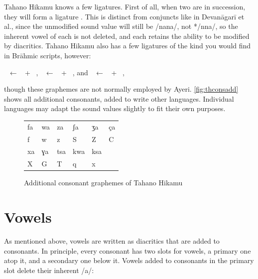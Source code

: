 Tahano Hikamu knows a few ligatures. First of all, when two   
are in succession, they will form a ligature  . This is 
distinct from conjuncts like in Devanāgarī et al., since the unmodified sound 
value will still be /nana/, not */nna/, so the inherent vowel of each  
 is not deleted, and each   retains the ability to be 
modified by diacritics. Tahano Hikamu also has a few ligatures of the kind you 
would find in Brāhmic scripts, however:

\pex
	\a {}~ ← ~ + ~, 
	\a {}~ ← ~ + ~, and 
	\a {}~ ← ~ + ~,
\xe

\noindent though these graphemes are not normally employed by Ayeri. 
\autoref{fig:thconsadd} shows all additional consonants, added to write other 
languages. Individual languages may adapt the sound values slightly to fit their 
own purposes.

\begin{figure}[ht]
\caption{Additional consonant graphemes of Tahano Hikamu}

\begin{tabu} to \linewidth{X[c] X[c] X[c] X[c] X[c] X[c]}
\toprule
\tableheaderfont	fa & wa & za & ʃa & ʒa & ça \\
\rowfont{\Tagati\huge}	f & w & z & S & Z & C \\

\midrule

\tableheaderfont	xa & ɣa & tsa & kwa & ksa \\
\rowfont{\Tagati\huge}	X & G & T & q & x \\

\bottomrule
\end{tabu}
\label{fig:thconsadd}
\end{figure}


\section{Vowels}

As mentioned above, vowels are written as diacritics that are added to 
consonants. In principle, every consonant has two slots for vowels, a primary 
one atop it, and a secondary one below it. Vowels added to consonants in 
the primary slot delete their inherent /a/:


